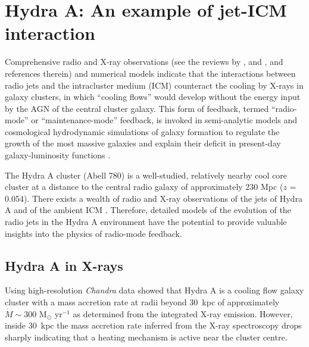 

  

\section{Hydra A: An example of jet-ICM interaction}\label{int:hyd}
Comprehensive radio and X-ray observations (see the reviews by \citealt{mcnamara07, mcnamara12}, and \citealt{fabian12}, and references therein) and numerical models \citep{gaspari11, dubois10} indicate that the interactions between radio jets and the intracluster medium (ICM) counteract the cooling by X-rays in galaxy clusters, in which ``cooling flows'' would develop without the energy input by the AGN of the central cluster galaxy. This form of feedback, termed ``radio-mode'' or ``maintenance-mode'' feedback, is invoked in semi-analytic models and cosmological hydrodynamic simulations of galaxy formation to regulate the growth of the most massive galaxies and explain their deficit in present-day galaxy-luminosity functions \citep{croton06, okamoto2008b, dubois13}. 

The Hydra A cluster (Abell 780) is a well-studied, relatively nearby cool core cluster at a distance to the central radio galaxy of approximately 230 Mpc ($z$ = 0.054). There exists a wealth of radio and X-ray observations of the jets of Hydra A and of the ambient ICM \citep{taylor90, mcnamara00, david01}. Therefore, detailed models of the evolution of the radio jets in the Hydra A environment have the potential to provide valuable insights into the physics of radio-mode feedback.

\subsection{Hydra A in X-rays}
Using high-resolution \textit{Chandra} data \citet{david01} showed that Hydra A is a cooling flow galaxy cluster with a mass accretion rate at radii beyond 30~kpc of approximately $\dot{M}\sim300$ M$_{\odot}$ yr$^{-1}$ as determined from the integrated  X-ray emission. However, inside 30~kpc the mass accretion rate inferred from the X-ray spectroscopy drops sharply indicating that a heating mechanism is active near the cluster centre.

